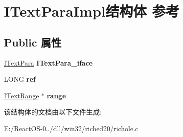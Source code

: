 \hypertarget{struct_i_text_para_impl}{}\section{I\+Text\+Para\+Impl结构体 参考}
\label{struct_i_text_para_impl}
\subsection*{Public 属性}
\begin{DoxyCompactItemize}
\item 
\mbox{\label{struct_i_text_para_impl_a405b27b594218a4ec4d8fdc270913350}} 
\hyperlink{interface_i_text_para}{I\+Text\+Para} {\bfseries I\+Text\+Para\+\_\+iface}
\item 
\mbox{\label{struct_i_text_para_impl_a88d4e3d8ae0e5e63356e2fa01406a3dc}} 
L\+O\+NG {\bfseries ref}
\item 
\mbox{\label{struct_i_text_para_impl_adbadea8b6674a7fe643cc759637742ed}} 
\hyperlink{interface_i_text_range}{I\+Text\+Range} $\ast$ {\bfseries range}
\end{DoxyCompactItemize}


该结构体的文档由以下文件生成\+:\begin{DoxyCompactItemize}
\item 
E\+:/\+React\+O\+S-\/0../dll/win32/riched20/richole.\+c\end{DoxyCompactItemize}
